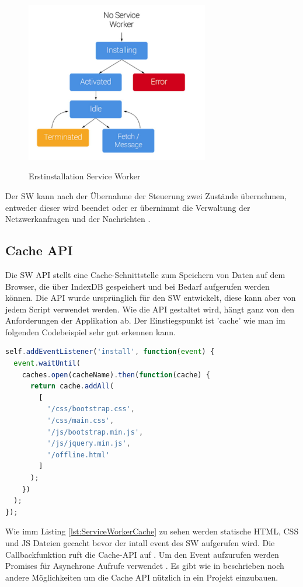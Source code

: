 \begin{figure}[h]
	\centering
	\includegraphics[width=8cm]{BilderAllgemein/InstallSW}\medskip
	\caption{Erstinstallation Service Worker}
	\label{fig:Erstinstallation}\cite{ServiceWorkerRegistration}
\end{figure}

Der \acs{SW} kann nach der Übernahme der Steuerung zwei Zustände übernehmen, entweder dieser wird beendet oder er übernimmt die Verwaltung der Netzwerkanfragen und der Nachrichten \cite{ServiceWorkerRegistration}.



\subsection{Cache API}
Die \acs{SW} API stellt eine Cache-Schnittstelle zum Speichern von Daten auf dem Browser, die über IndexDB \cite{IndexDB} gespeichert und bei Bedarf aufgerufen werden können. Die API wurde ursprünglich für den \acs{SW} entwickelt, diese kann aber von jedem Script verwendet werden. 
Wie die API gestaltet wird, hängt ganz von den Anforderungen der Applikation ab.
Der Einstiegspunkt ist 'cache' wie man im folgenden Codebeispiel sehr gut erkennen kann.

\begin{lstlisting}[language=JavaScript, caption={Service Worker Cache},label=lst:ServiceWorkerCache, xleftmargin=50pt, label=cache]
self.addEventListener('install', function(event) {
  event.waitUntil(
    caches.open(cacheName).then(function(cache) {
      return cache.addAll(
        [
          '/css/bootstrap.css',
          '/css/main.css',
          '/js/bootstrap.min.js',
          '/js/jquery.min.js',
          '/offline.html'
        ]
      );
    })
  );
});
\end{lstlisting}

Wie imm Listing \ref{lst:ServiceWorkerCache} zu sehen werden statische HTML, CSS und JS Dateien gecacht bevor der intall event des \acs{SW} aufgerufen wird. Die Callbackfunktion ruft die Cache-API auf \cite{CacheAPI}.
Um den Event aufzurufen werden Promises für Asynchrone Aufrufe verwendet \cite{Promises}.
Es gibt wie in \cite{CacheAPI} beschrieben noch andere Möglichkeiten um die Cache API nützlich in ein Projekt einzubauen.
\newpage

